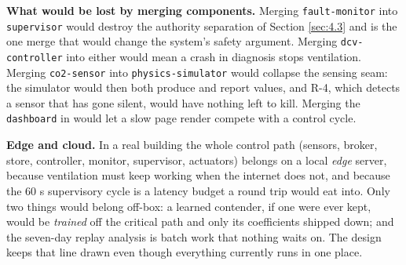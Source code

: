 \textbf{What would be lost by merging components.} Merging \texttt{fault-monitor} into
\texttt{supervisor} would destroy the authority separation of Section \ref{sec:4.3} and is the one merge that
would change the system's safety argument. Merging \texttt{dcv-controller} into either would mean a
crash in diagnosis stops ventilation. Merging \texttt{co2-sensor} into
\texttt{physics-simulator} would collapse the sensing seam: the simulator would then both produce
and report values, and R-4, which detects a sensor that has gone silent, would have nothing left
to kill. Merging the \texttt{dashboard} in would let a slow page render compete with a control
cycle.

\textbf{Edge and cloud.} In a real building the whole control path (sensors, broker, store,
controller, monitor, supervisor, actuators) belongs on a local \emph{edge} server, because
ventilation must keep working when the internet does not, and because the 60 s supervisory cycle is
a latency budget a round trip would eat into. Only two things would belong off-box: a learned
contender, if one were ever kept, would be \emph{trained} off the critical path and only its
coefficients shipped down; and the seven-day replay analysis is batch work that nothing waits on.
The design keeps that line drawn even though everything currently runs in one place.
